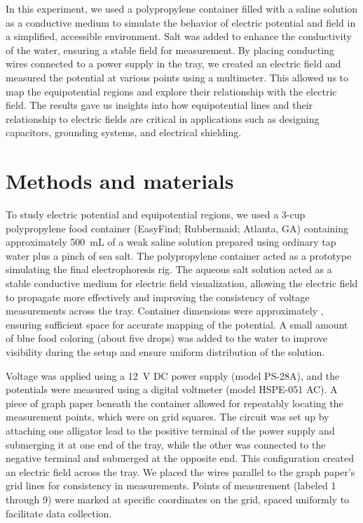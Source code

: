 \documentclass[10pt,journal,twoside]{IEEEtran}
\begin{document}
In this experiment, we used a polypropylene container filled with a saline solution as a conductive medium to simulate the behavior of electric potential and field in a simplified, accessible environment. Salt was added to enhance the conductivity of the water, ensuring a stable field for measurement. By placing conducting wires connected to a power supply in the tray, we created an electric field and measured the potential at various points using a multimeter. This allowed us to map the equipotential regions and explore their relationship with the electric field. The results gave us insights into how equipotential lines and their relationship to electric fields are critical in applications such as designing capacitors, grounding systems, and electrical shielding.






\section{Methods and materials}
To study electric potential and equipotential regions, we used a 3-cup polypropylene food container (EasyFind; Rubbermaid; Atlanta, GA) containing approximately \qty{500}{\milli\liter} of a weak saline solution prepared using ordinary tap water plus a pinch of sea salt. The polypropylene container acted as a prototype simulating the final electrophoresis rig. The aqueous salt solution acted as a stable conductive medium for electric field visualization, allowing the electric field to propagate more effectively and improving the consistency of voltage measurements across the tray. Container dimensions were approximately , ensuring sufficient space for accurate mapping of the potential. A small amount of blue food coloring (about five drops) was added to the water to improve visibility during the setup and ensure uniform distribution of the solution.

Voltage was applied using a \qty{12}{\volt} DC power supply (model PS-28A), and the potentials were measured using a digital voltmeter (model HSPE-051 AC). A piece of graph paper beneath the container allowed for repeatably locating the measurement points, which were on  grid squares. The circuit was set up by attaching one alligator lead to the positive terminal of the power supply and submerging it at one end of the tray, while the other was connected to the negative terminal and submerged at the opposite end. This configuration created an electric field across the tray. We placed the wires parallel to the graph paper's grid lines for consistency in measurements. Points of measurement (labeled 1 through 9) were marked at specific coordinates on the grid, spaced uniformly to facilitate data collection.
\end{document}
